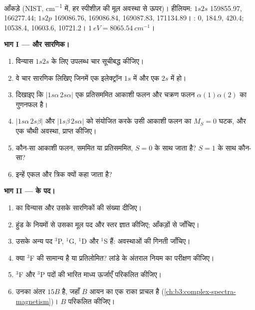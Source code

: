 \begin{problem}
\label{pb:b3:many-electron-atoms:1}
आँकड़े (NIST, \unit{cm^{-1}} में, हर स्पीशीज़ की मूल अवस्था से ऊपर)। हीलियम:
$1s2s$  159855.97,  166277.44; $1s2p$
 169086.76, 169086.84, 169087.83, 
171134.89। :  0, 184.9, 420.4; 
10538.4, 10603.6, 10721.2। $\qty{1}{eV} = \qty{8065.54}{cm^{-1}}$।

\medskip\noindent\textbf{भाग I ---  और सारणिक।}
\begin{enumerate}
  \item विन्यास $1s2s$ के लिए उपलब्ध चार  सूचीबद्ध कीजिए।
  \item वे चार सारणिक लिखिए जिनमें एक इलेक्ट्रॉन $1s$ में और एक
        $2s$ में हो।
  \item दिखाइए कि $|1s\alpha\,2s\alpha|$ एक प्रतिसममित
        आकाशी फलन और चक्रण फलन $\alpha(1)\alpha(2)$ का गुणनफल है।
  \item $|1s\alpha\,2s\beta|$ और $|1s\beta\,2s\alpha|$ को संयोजित करके उसी आकाशी फलन का
        $M_S = 0$ घटक, और एक चौथी अवस्था, प्राप्त कीजिए।
  \item कौन-सा आकाशी फलन, सममित या प्रतिसममित,
        $S = 0$ के साथ जाता है? $S = 1$ के साथ कौन-सा?
  \item इन्हें एकल और त्रिक क्यों कहा जाता है?
\end{enumerate}

\medskip\noindent\textbf{भाग II ---  के पद।}
\begin{enumerate}[resume]
  \item {} का विन्यास और उसके
        सारणिकों की संख्या दीजिए।
  \item हुंड के नियमों से उसका मूल पद और स्तर ज्ञात कीजिए; आँकड़ों से
        जाँचिए।
  \item उसके अन्य पद ${}^3$P, ${}^1$G, ${}^1$D और ${}^1$S हैं: अवस्थाओं की गिनती
        जाँचिए।
  \item क्या ${}^3$F की  सामान्य है या प्रतिलोमित? लांडे के
        अंतराल नियम का परीक्षण कीजिए।
  \item ${}^3$F और ${}^3$P पदों की भारित माध्य ऊर्जाएँ परिकलित कीजिए।
  \item उनका अंतर $15B$ है, जहाँ $B$ आयन का एक राका
        प्राचल है (\cref{ch:b3:complex-spectra-magnetism})। $B$ परिकलित कीजिए।
\end{enumerate}


\end{problem}
